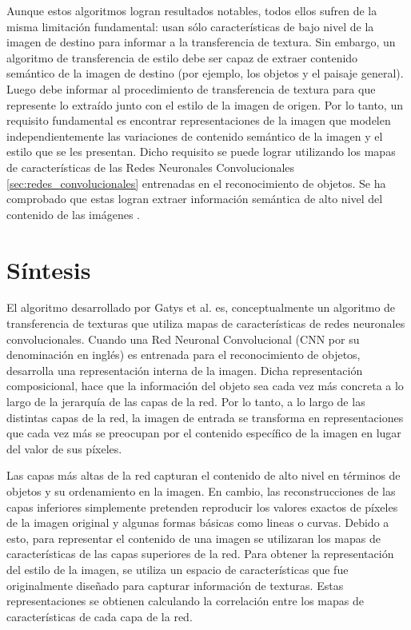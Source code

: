 \documentclass[a4paper,11pt,spanish]{book}
\begin{document}
      Aunque estos algoritmos logran resultados notables, todos ellos sufren de la misma limitación fundamental: usan sólo características de bajo nivel de la imagen de destino para
      informar a la transferencia de textura. Sin embargo, un algoritmo de transferencia de estilo debe ser capaz de extraer contenido semántico de la imagen de
      destino (por ejemplo, los objetos y el paisaje general). Luego debe informar al procedimiento de transferencia de textura para que represente lo extraído
      junto con el estilo de la imagen de origen. Por lo tanto, un requisito fundamental es encontrar representaciones de la imagen que modelen independientemente las variaciones
      de contenido semántico de la imagen y el estilo que se les presentan. Dicho requisito se puede lograr utilizando los mapas de características de las Redes Neuronales Convolucionales \ref{sec:redes_convolucionales}
      entrenadas en el reconocimiento de objetos. Se ha comprobado que estas logran extraer información semántica de alto nivel del contenido de las imágenes \cite{AlexNet}.


    \section{Síntesis} \label{sec:sintesis}
      El algoritmo desarrollado por Gatys et al. es, conceptualmente un algoritmo de transferencia de texturas que utiliza mapas de características de redes neuronales 
      convolucionales. 
      Cuando una Red Neuronal Convolucional (CNN por su denominación en inglés) es entrenada para el reconocimiento de objetos, desarrolla una representación interna de la 
      imagen.
      Dicha representación composicional, hace que la información del objeto sea cada vez más concreta a lo largo de la jerarquía de las capas de la red. 
      Por lo tanto, a lo largo de las distintas capas de la red, la imagen de entrada se transforma en representaciones que cada vez más se preocupan 
      por el contenido específico de la imagen en lugar del valor de sus píxeles.
      
      Las capas más altas de la red capturan el contenido de alto nivel en términos de objetos y su ordenamiento en la imagen. 
      En cambio, las reconstrucciones de las capas inferiores simplemente pretenden reproducir los valores exactos de píxeles de la imagen original y algunas formas
      básicas como lineas o curvas. 
      Debido a esto, para representar el contenido de una imagen se utilizaran los mapas de características de las capas superiores de la red.
      Para obtener la representación del estilo de la imagen, se utiliza un espacio de características que fue originalmente diseñado para capturar información de texturas.
      Estas representaciones se obtienen calculando la correlación entre los mapas de características de cada capa de la red. 
      
\end{document}
